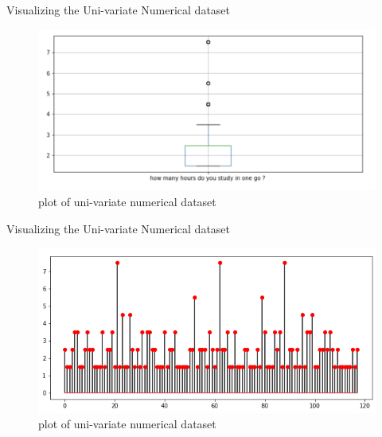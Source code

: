 \documentclass{beamer}
\begin{document}
\begin{frame}
\begin{block}{Visualizing the Uni-variate Numerical dataset}
\begin{figure}[hbtp]
\caption{plot of uni-variate numerical dataset}
\centering
\includegraphics[scale=0.55]{output3.1.png}
\end{figure}
\end{block}
\end{frame}

\begin{frame}
\begin{block}{Visualizing the Uni-variate Numerical dataset}
\begin{figure}[hbtp]
\caption{plot of uni-variate numerical dataset}
\centering
\includegraphics[scale=0.55]{output3.2.png}
\end{figure}
\end{block}
\end{frame}
\end{document}
